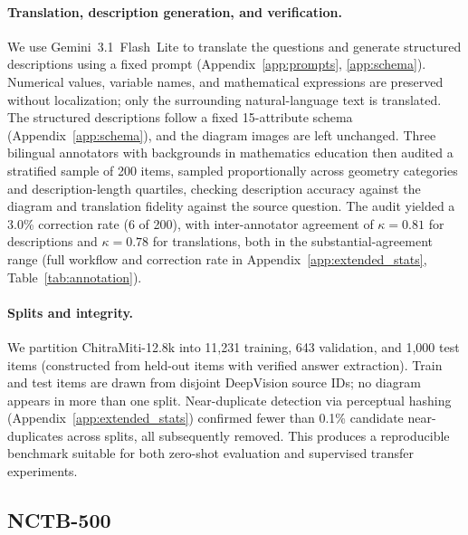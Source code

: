 \documentclass[11pt]{article}
\begin{document}
\paragraph{Translation, description generation, and verification.} We use Gemini~3.1~Flash~Lite \citep{gemini2026flashlite} to translate the questions and generate structured descriptions using a fixed prompt (Appendix~\ref{app:prompts}, \ref{app:schema}). Numerical values, variable names, and mathematical expressions are preserved without localization; only the surrounding natural-language text is translated. The structured descriptions follow a fixed 15-attribute schema (Appendix~\ref{app:schema}), and the diagram images are left unchanged. Three bilingual annotators with backgrounds in mathematics education then audited a stratified sample of 200 items, sampled proportionally across geometry categories and description-length quartiles, checking description accuracy against the diagram and translation fidelity against the source question. The audit yielded a 3.0\% correction rate (6 of 200), with inter-annotator agreement of $\kappa=0.81$ for descriptions and $\kappa=0.78$ for translations, both in the substantial-agreement range (full workflow and correction rate in Appendix~\ref{app:extended_stats}, Table~\ref{tab:annotation}).

\paragraph{Splits and integrity.} We partition ChitraMiti-12.8k into 11,231 training, 643 validation, and 1,000 test items (constructed from held-out items with verified answer extraction). Train and test items are drawn from disjoint DeepVision source IDs; no diagram appears in more than one split. Near-duplicate detection via perceptual hashing (Appendix~\ref{app:extended_stats}) confirmed fewer than 0.1\% candidate near-duplicates across splits, all subsequently removed. This produces a reproducible benchmark suitable for both zero-shot evaluation and supervised transfer experiments.

\subsection{NCTB-500}
\label{ssec:nctb500}
\end{document}
